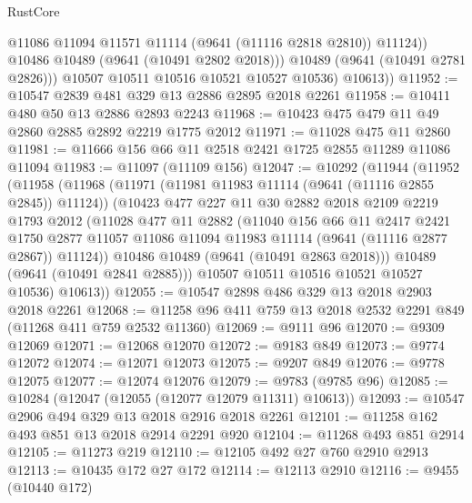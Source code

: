\begin{lexlean}{RustCore}
\begin{coremodule}
                  @11086
                  @11094
                  @11571
                  @11114
                  (@9641 (@11116 @2818 @2810))
                  @11124))
              @10486
              @10489
              (@9641 (@10491 @2802 @2018)))
            @10489
            (@9641 (@10491 @2781 @2826)))
          @10507
          @10511
          @10516
          @10521
          @10527
          @10536)
        @10613))
@11952 := @10547 @2839 @481 @329 @13 @2886 @2895 @2018 @2261
@11958 := @10411 @480 @50 @13 @2886 @2893 @2243
@11968 := @10423 @475 @479 @11 @49 @2860 @2885 @2892 @2219 @1775 @2012
@11971 := @11028 @475 @11 @2860
@11981 := @11666 @156 @66 @11 @2518 @2421 @1725 @2855 @11289 @11086 @11094
@11983 := @11097 (@11109 @156)
@12047 := @10292
    (@11944
      (@11952
        (@11958
          (@11968
            (@11971 (@11981 @11983 @11114 (@9641 (@11116 @2855 @2845)) @11124))
            (@10423
              @477
              @227
              @11
              @30
              @2882
              @2018
              @2109
              @2219
              @1793
              @2012
              (@11028
                @477
                @11
                @2882
                (@11040
                  @156
                  @66
                  @11
                  @2417
                  @2421
                  @1750
                  @2877
                  @11057
                  @11086
                  @11094
                  @11983
                  @11114
                  (@9641 (@11116 @2877 @2867))
                  @11124))
              @10486
              @10489
              (@9641 (@10491 @2863 @2018)))
            @10489
            (@9641 (@10491 @2841 @2885)))
          @10507
          @10511
          @10516
          @10521
          @10527
          @10536)
        @10613))
@12055 := @10547 @2898 @486 @329 @13 @2018 @2903 @2018 @2261
@12068 := @11258 @96 @411 @759 @13 @2018 @2532 @2291 @849 (@11268 @411 @759 @2532 @11360)
@12069 := @9111 @96
@12070 := @9309 @12069
@12071 := @12068 @12070
@12072 := @9183 @849
@12073 := @9774 @12072
@12074 := @12071 @12073
@12075 := @9207 @849
@12076 := @9778 @12075
@12077 := @12074 @12076
@12079 := @9783 (@9785 @96)
@12085 := @10284 (@12047 (@12055 (@12077 @12079 @11311) @10613))
@12093 := @10547 @2906 @494 @329 @13 @2018 @2916 @2018 @2261
@12101 := @11258 @162 @493 @851 @13 @2018 @2914 @2291 @920
@12104 := @11268 @493 @851 @2914
@12105 := @11273 @219
@12110 := @12105 @492 @27 @760 @2910 @2913
@12113 := @10435 @172 @27 @172
@12114 := @12113 @2910
@12116 := @9455 (@10440 @172)

\end{coremodule}
\end{lexlean}
